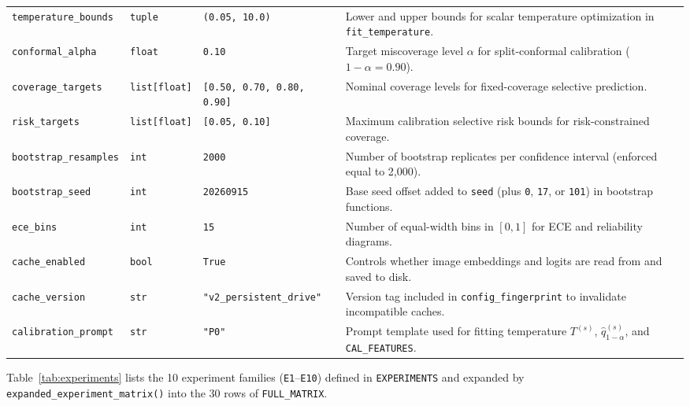 \documentclass[11pt,a4paper]{article}
\begin{document}
\begin{table}[!htbp]
\begin{tabularx}{\textwidth}{L{0.23\textwidth} L{0.11\textwidth} L{0.24\textwidth} Y}
\texttt{temperature\_\allowbreak{}bounds} & \texttt{tuple} & \texttt{(\allowbreak{}0.\allowbreak{}05,\allowbreak{} 10.\allowbreak{}0)} & Lower and upper bounds for scalar temperature optimization in \texttt{fit\_\allowbreak{}temperature}. \\
\texttt{conformal\_\allowbreak{}alpha} & \texttt{float} & \texttt{0.\allowbreak{}10} & Target miscoverage level $\alpha$ for split-conformal calibration ($1 - \alpha = 0.90$). \\
\texttt{coverage\_\allowbreak{}targets} & \texttt{list[float]} & \texttt{[0.\allowbreak{}50,\allowbreak{} 0.\allowbreak{}70,\allowbreak{} 0.\allowbreak{}80,\allowbreak{} 0.\allowbreak{}90]} & Nominal coverage levels for fixed-coverage selective prediction. \\
\texttt{risk\_\allowbreak{}targets} & \texttt{list[float]} & \texttt{[0.\allowbreak{}05,\allowbreak{} 0.\allowbreak{}10]} & Maximum calibration selective risk bounds for risk-constrained coverage. \\
\texttt{bootstrap\_\allowbreak{}resamples} & \texttt{int} & \texttt{2000} & Number of bootstrap replicates per confidence interval (enforced equal to 2,000). \\
\texttt{bootstrap\_\allowbreak{}seed} & \texttt{int} & \texttt{20260915} & Base seed offset added to \texttt{seed} (plus \texttt{0}, \texttt{17}, or \texttt{101}) in bootstrap functions. \\
\texttt{ece\_\allowbreak{}bins} & \texttt{int} & \texttt{15} & Number of equal-width bins in $[0, 1]$ for ECE and reliability diagrams. \\
\texttt{cache\_\allowbreak{}enabled} & \texttt{bool} & \texttt{True} & Controls whether image embeddings and logits are read from and saved to disk. \\
\texttt{cache\_\allowbreak{}version} & \texttt{str} & \texttt{"v2\_\allowbreak{}persistent\_\allowbreak{}drive"} & Version tag included in \texttt{config\_\allowbreak{}fingerprint} to invalidate incompatible caches. \\
\texttt{calibration\_\allowbreak{}prompt} & \texttt{str} & \texttt{"P0"} & Prompt template used for fitting temperature $T^{(s)}$, $\hat{q}_{1-\alpha}^{(s)}$, and \texttt{CAL\_\allowbreak{}FEATURES}. \\
\bottomrule
\end{tabularx}
\end{table}

Table~\ref{tab:experiments} lists the 10 experiment families (\texttt{E1}--\texttt{E10}) defined in \texttt{EXPERIMENTS} and expanded by \texttt{expanded\_\allowbreak{}experiment\_\allowbreak{}matrix(\allowbreak{})} into the 30 rows of \texttt{FULL\_\allowbreak{}MATRIX}.
\end{document}
